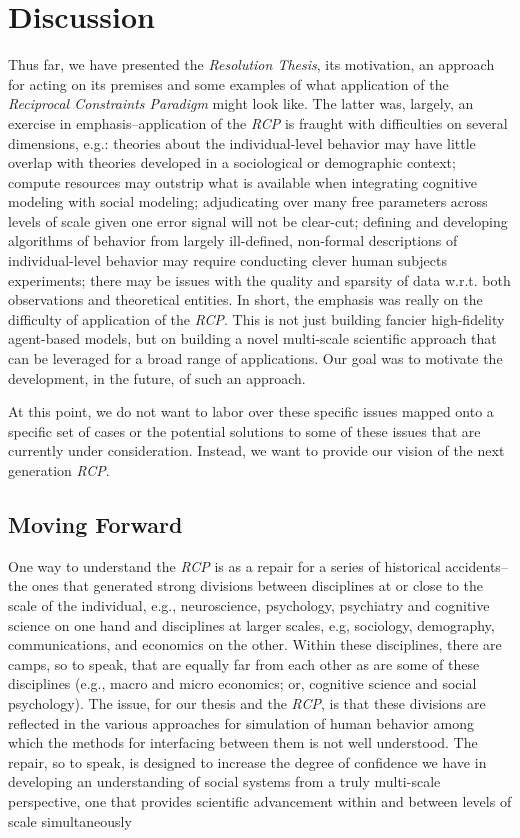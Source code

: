 \documentclass{article}
\begin{document}
\section{Discussion}
Thus far, we have presented the \textit{Resolution Thesis}, its motivation, an approach for acting on its premises and some examples of what application of the \textit{Reciprocal Constraints Paradigm} might look like.  The latter was, largely, an exercise in emphasis--application of the \textit{RCP} is fraught with difficulties on several dimensions, e.g.:  theories about the individual-level behavior may have little overlap with theories developed in a sociological or demographic context; compute resources may outstrip what is available when integrating cognitive modeling with social modeling; adjudicating over many free parameters across levels of scale given one error signal will not be clear-cut; defining and developing algorithms of behavior from largely ill-defined, non-formal descriptions of individual-level behavior may require conducting clever human subjects experiments; there may be issues with the quality and sparsity of data w.r.t. both observations and theoretical entities.  In short, the emphasis was really on the difficulty of application of the \textit{RCP}.  This is not just building fancier high-fidelity agent-based models, but on building a novel multi-scale scientific approach that can be leveraged for a broad range of applications.  Our goal was to motivate the development, in the future, of such an approach.
  
At this point, we do not want to labor over these specific issues mapped onto a specific set of cases or the potential solutions to some of these issues that are currently under consideration\cite{orr2018brims}.  Instead, we want to provide our vision of the next generation \textit{RCP}. 

\subsection{Moving Forward}
One way to understand the \textit{RCP} is as a repair for a series of historical accidents--the ones that generated strong divisions between disciplines at or close to the scale of the individual, e.g.,  neuroscience, psychology, psychiatry and cognitive science on one hand and disciplines at larger scales, e.g, sociology, demography, communications, and economics on the other.  Within these disciplines, there are camps, so to speak, that are equally far from each other as are some of these disciplines (e.g., macro and micro economics; or, cognitive science and social psychology).  The issue, for our thesis and the \textit{RCP}, is that these divisions are reflected in the various approaches for simulation of human behavior among which the methods for interfacing between them is not well understood.  The repair, so to speak, is designed to increase the degree of confidence we have in developing an understanding of social systems from a truly multi-scale perspective, one that provides scientific advancement within and between levels of scale simultaneously 
\end{document}
